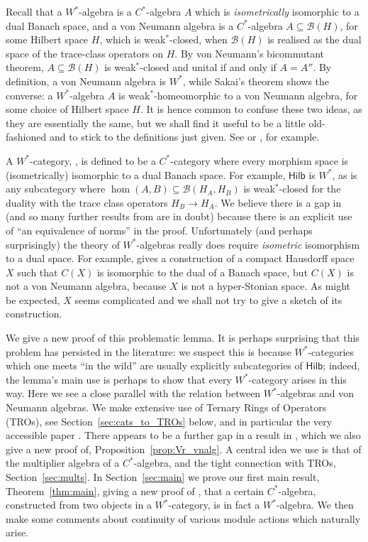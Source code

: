 \documentclass[a4paper,11pt]{article}
\theoremstyle{plain}
\theoremstyle{remark}
\newcommand{\mc}[1]{\mathcal{#1}}
\newcommand{\catHilb}{\textsf{Hilb}}
\begin{document}
Recall that a $W^*$-algebra is a $C^*$-algebra $A$ which is \emph{isometrically} isomorphic to a dual Banach space, and a von Neumann algebra is a $C^*$-algebra $A \subseteq\mc B(H)$, for some Hilbert space $H$, which is weak$^*$-closed, when $\mc B(H)$ is realised as the dual space of the trace-class operators on $H$.  By von Neumann's bicommutant theorem, $A \subseteq\mc B(H)$ is weak$^*$-closed and unital if and only if $A = A''$.  By definition, a von Neumann algebra is $W^*$, while Sakai's theorem shows the converse: a $W^*$-algebra $A$ is weak$^*$-homeomorphic to a von Neumann algebra, for some choice of Hilbert space $H$.  It is hence common to confuse these two ideas, as they are essentially the same, but we shall find it useful to be a little old-fashioned and to stick to the definitions just given.  See \cite[Section~III.3]{TakesakiI} or \cite{Sakai_Book}, for example.

A $W^*$-category, \cite{GLR_Wstar_categories}, is defined to be a $C^*$-category where every morphism space is (isometrically) isomorphic to a dual Banach space.  For example, $\catHilb$ is $W^*$, as is any subcategory where $\hom(A,B) \subseteq\mc B(H_A,H_B)$ is weak$^*$-closed for the duality with the trace class operators $H_B\to H_A$.  We believe there is a gap in \cite[Lemma~2.6]{GLR_Wstar_categories} (and so many further results from \cite{GLR_Wstar_categories} are in doubt) because there is an explicit use of ``an equivalence of norms'' in the proof.  Unfortunately (and perhaps surprisingly) the theory of $W^*$-algebras really does require \emph{isometric} isomorphism to a dual space.  For example, \cite[Example~6.9.10]{DDLS_CX_spaces_Book} gives a construction of a compact Hausdorff space $X$ such that $C(X)$ is isomorphic to the dual of a Banach space, but $C(X)$ is not a von Neumann algebra, because $X$ is not a hyper-Stonian space.  As might be expected, $X$ seems complicated and we shall not try to give a sketch of its construction.

We give a new proof of this problematic lemma.  It is perhaps surprising that this problem has persisted in the literature: we suspect this is because $W^*$-categories which one meets ``in the wild'' are usually explicitly subcategories of $\catHilb$; indeed, the lemma's main use is perhaps to show that every $W^*$-category arises in this way.  Here we see a close parallel with the relation between $W^*$-algebras and von Neumann algebras.  We make extensive use of Ternary Rings of Operators (TROs), see Section~\ref{sec:cats_to_TROs} below, and in particular the very accessible paper \cite{EOR_InjectivityNuclearityOS}.  There appears to be a further gap in a result in \cite{EOR_InjectivityNuclearityOS}, which we also give a new proof of, Proposition~\ref{prop:Vr_vnalg}.  A central idea we use is that of the multiplier algebra of a $C^*$-algebra, and the tight connection with TROs, Section~\ref{sec:mults}.  In Section~\ref{sec:main} we prove our first main result, Theorem~\ref{thm:main}, giving a new proof of \cite[Lemma~2.6]{GLR_Wstar_categories}, that a certain $C^*$-algebra, constructed from two objects in a $W^*$-category, is in fact a $W^*$-algebra.  We then make some comments about continuity of various module actions which naturally arise.
\end{document}
